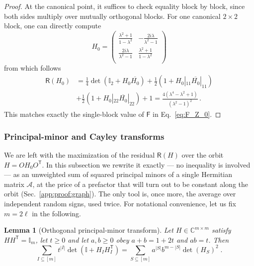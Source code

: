 \documentclass[prx,twocolumn,superscriptaddress,aps,10pt, frontmatterverbose, reprint,footinbib,longbibliography=true]{revtex4-2}
\newtheorem{lemma}{Lemma}
\newcommand{\trans}{\mathsf{T}}
\begin{document}
\begin{proof}
At the canonical point, it suffices to check equality block by block, since both sides multiply over mutually orthogonal blocks. For one canonical $2\times2$ block, one can directly compute
\begin{equation}
    H_0= \left(
\begin{array}{cc}
 \frac{\lambda ^2+1}{1-\lambda ^2} & -\frac{2 i \lambda }{\lambda ^2-1} \\
 \frac{2 i \lambda }{\lambda ^2-1} & \frac{\lambda ^2+1}{1-\lambda ^2} \\
\end{array}
\right)
\end{equation}
from which follows
\begin{equation}
\begin{split}
    \mathsf{R}(H_0)&= \frac{1}{4} \det(\mathbb{I}_2+ H_0\overline{H_0}) + \frac{1}{2} (1+ H_0|_{11} \overline{H_0} |_{11} ) \\
    &+ \frac{1}{2} (1+ H_0|_{22} \overline{H_0} |_{22} ) + 1= \frac{4 \left(\lambda ^4-\lambda ^2+1\right)}{\left(\lambda ^2-1\right)^2}\,.
\end{split}
\end{equation}
This matches exactly the single-block value of $\mathsf{F}$ in Eq.~\eqref{eq:F_Z_0}.
\end{proof}
\subsubsection{Principal-minor and Cayley transforms}
\label{app:proof:cayley}

We are left with the maximization of the residual $\mathsf{R}(H)$ over the orbit $H=OH_0O^{\trans}$. In this subsection we rewrite it exactly --- no inequality is involved --- as an unweighted sum of squared principal minors of a single Hermitian matrix $\mathcal{A}$, at the price of a prefactor that will turn out to be constant along the orbit (Sec.~\ref{app:proof:graph}). The only tool is, once more, the average over independent random signs, used twice.
For notational convenience, let us fix $m=2\ell$ in the following. 
\begin{lemma}[Orthogonal principal-minor transform]
\label{lem:PMT}
Let $H\in\mathbb{C}^{m\times m}$ satisfy $HH^{\trans}=\mathbb{I}_m$, let $t\ge0$ and let $a,b\ge0$ obey $a+b=1+2t$ and $ab=t$. Then
\begin{equation}
    \sum_{I\subseteq[m]}t^{|I|}\det\!\left(\mathbb{I}+H_IH_I^{\trans}\right)=\sum_{S\subseteq[m]}a^{|S|}b^{m-|S|}\det(H_S)^2\;.
    \label{eq:PMT}
\end{equation}
\end{lemma}
\end{document}
